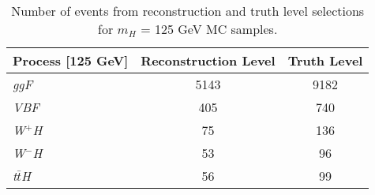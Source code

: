 \documentclass[a4paper, oneside, 11pt, openright]{book}
\begin{document}
 			\begin{table}[tbp]
 				\centering
 				\begin{tabular}{lcc}
 					\toprule[1.5pt]
 					Process	[125 GeV]		& Reconstruction Level	& Truth Level	\\
 					\midrule
 					\textit{ggF}			& 5143					& 9182		\\
 					\textit{VBF}			& 405	 				& 740			\\
					\textit{W$^+$H}			& 75	 				& 136			\\
 					\textit{W$^-$H}			& 53 					& 96			\\
 					\textit{t$\bar{t}$H}	& 56	 				& 99			\\
 					\bottomrule[1.5pt]	
 				\end{tabular}
 				\caption{Number of events from reconstruction and truth level selections for $m_H$ = 125 GeV MC samples.}
 				\label{tab:sel_events}
 			\end{table}	
 			
\end{document}
